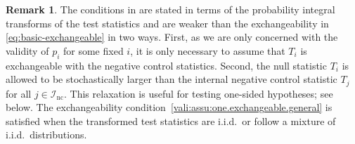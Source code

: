 \documentclass[a4paper,11pt]{article}
\newcommand{\zg}[1]{{\color{blue} [ZG: #1]}}
\theoremstyle{plain}
\theoremstyle{definition}
\newtheorem{remark}{Remark}
\def\calH{\mathcal{H}}
\def\calI{\mathcal{I}}
\theoremstyle{plain}
\newcommand{\pval}[1]{{p_{#1}}}
\newcommand{\testStatistics}[1]{{T_{#1}}}
\newcommand{\ncTestStatistics}[1]{{C_{#1}}}
\newcommand{\hypothesis}[1]{{H_{#1}}}
\newcommand{\hypothesisIndex}[1]{{\calI_{#1}}}
\newcommand{\nullHypothesisSet}{{\calH_{0}}}
\newcommand{\ncHypothesis}[1]{{H^{\text{nc}}_{#1}}}
\newcommand{\ncHypothesisSet}{{\calH_{\text{nc}}}}
\begin{document}
\begin{remark}
The conditions in  are stated in terms of
the probability integral transforms of the test statistics and are weaker
than the exchangeability in \eqref{eq:basic-exchangeable} in two
ways. First, as we are only
concerned with the validity of $\pval{i}$ for some fixed $i$, it is
only necessary to
assume that $\testStatistics{i}$ is exchangeable with the negative
control statistics. Second, the null statistic
$\testStatistics{i}$ is allowed to be stochastically larger than the
internal negative control statistic $\testStatistics{j}$ for all $j\in
\hypothesisIndex{\text{nc}}$. This relaxation is useful for
testing one-sided hypotheses; see  below.
The exchangeability
condition~\ref{vali:assu:one.exchangeable.general} is
satisfied when the transformed test statistics are i.i.d.\ or follow a
mixture of i.i.d.\ distributions.
\end{remark}

\end{document}
